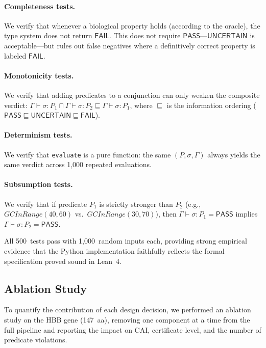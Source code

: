 \documentclass[acmsmall,review,anonymous]{acmart}
\newcommand{\PASS}{\ensuremath{\mathsf{PASS}}\xspace}
\newcommand{\FAIL}{\ensuremath{\mathsf{FAIL}}\xspace}
\newcommand{\UNCERTAIN}{\ensuremath{\mathsf{UNCERTAIN}}\xspace}
\newcommand{\seq}{\sigma}
\newcommand{\pred}{P}
\newcommand{\judg}[3]{#1 \vdash #2 : #3}
\begin{document}
\paragraph{Completeness tests.}
We verify that whenever a biological property holds (according to the
oracle), the type system does not return \FAIL.  This does not require
\PASS---\UNCERTAIN{} is acceptable---but rules out false negatives
where a definitively correct property is labeled \FAIL.

\paragraph{Monotonicity tests.}
We verify that adding predicates to a conjunction can only weaken the
composite verdict: $\judg{\Gamma}{\seq}{\pred_1} \sqcap
\judg{\Gamma}{\seq}{\pred_2} \sqsubseteq
\judg{\Gamma}{\seq}{\pred_1}$, where $\sqsubseteq$ is the information
ordering ($\PASS \sqsubseteq \UNCERTAIN \sqsubseteq \FAIL$).

\paragraph{Determinism tests.}
We verify that \texttt{evaluate} is a pure function: the same
$(\pred, \seq, \Gamma)$ always yields the same verdict across 1,000
repeated evaluations.

\paragraph{Subsumption tests.}
We verify that if predicate $\pred_1$ is strictly stronger than
$\pred_2$ (e.g., $\mathit{GCInRange}(40, 60)$ vs.\
$\mathit{GCInRange}(30, 70)$), then $\judg{\Gamma}{\seq}{\pred_1} =
\PASS$ implies $\judg{\Gamma}{\seq}{\pred_2} = \PASS$.

All 500~tests pass with 1,000~random inputs each, providing strong
empirical evidence that the Python implementation faithfully reflects
the formal specification proved sound in Lean~4.

\subsection{Ablation Study}\label{sec:ablation}

To quantify the contribution of each design decision, we performed an
ablation study on the HBB gene (147~aa), removing one component at a
time from the full pipeline and reporting the impact on CAI, certificate
level, and the number of predicate violations.
\end{document}
